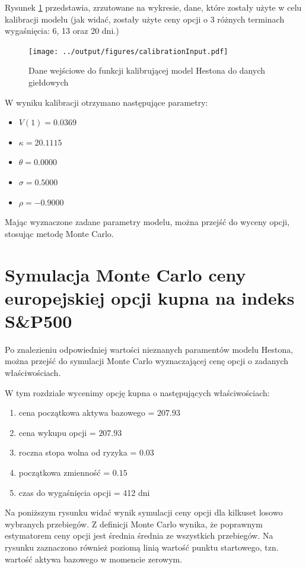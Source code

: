 \documentclass{pracamgr}
\begin{document}
Rysunek \ref{fig:calibration} przedstawia, zrzutowane na wykresie, dane, które
zostały użyte w celu kalibracji modelu (jak widać, zostały użyte ceny 
opcji o 3 różnych terminach wygaśnięcia: 
6, 13 oraz 20 dni.)

\begin{figure}
  \centering
  \texttt{[image: ../output/figures/calibrationInput.pdf]}
  \caption{Dane wejściowe do funkcji kalibrującej model Hestona do danych giełdowych}
  \label{fig:calibration}
\end{figure}

W wyniku kalibracji otrzymano następujące parametry:

\begin{itemize}
  \item $V(1) = 0.0369 $
  \item $\kappa = 20.1115$
  \item $\theta = 0.0000$
  \item $\sigma = 0.5000$
  \item $\rho = -0.9000$
\end{itemize}


Mając wyznaczone zadane parametry modelu, można przejść do wyceny opcji, stosując metodę Monte Carlo.


\section{Symulacja Monte Carlo ceny europejskiej opcji kupna na indeks S\&P500}

Po znalezieniu odpowiedniej wartości nieznanych paramentów modelu Hestona, można 
przejść do symulacji Monte Carlo wyznaczającej cenę opcji o zadanych właściwościach.

W tym rozdziale wycenimy opcję kupna o następujących właściwościach:
\begin{enumerate}
  \item cena początkowa aktywa bazowego = $207.93$
  \item cena wykupu opcji = $207.93$ 
  \item roczna stopa wolna od ryzyka = $0.03$
  \item początkowa zmienność =  $0.15$
  \item czas do wygaśnięcia opcji = 412 dni
\end{enumerate}
 
Na poniższym rysunku widać wynik symulacji ceny opcji dla kilkuset losowo wybranych przebiegów.
Z definicji Monte Carlo wynika, że poprawnym estymatorem ceny
opcji jest średnia średnia ze wszystkich przebiegów.
Na rysunku zaznaczono również poziomą linią wartość punktu startowego, tzn. wartość 
aktywa bazowego w momencie zerowym.
\end{document}
